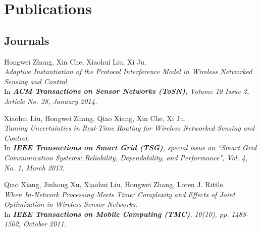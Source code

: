 
\section{Publications}
\subsection{Journals}
\begin{thebibliography}{3}
Hongwei Zhang, Xin Che, Xiaohui Liu, Xi Ju.
\\ \newblock \emph{Adaptive Instantiation of the Protocol Interference Model in Wireless Networked Sensing and Control}.
\\ \newblock In \emph{\textbf{ACM Transactions on Sensor Networks (ToSN)}, Volume 10 Issue 2, Article No. 28, January 2014.}

Xiaohui Liu, Hongwei Zhang, Qiao Xiang, Xin Che, Xi Ju.
\\ \newblock \emph{Taming Uncertainties in Real-Time Routing for Wireless Networked Sensing and Control}.
\\ \newblock In \emph{\textbf{IEEE Transactions on Smart Grid (TSG)}, special issue on “Smart Grid Communication Systems: Reliability, Dependability, and Performance", Vol. 4, No. 1, March 2013.}

Qiao Xiang, Jinhong Xu, Xiaohui Liu, Hongwei Zhang, Loren J. Rittle.
\\ \newblock \emph{When In-Network Processing Meets Time: Complexity and Effects of Joint Optimization in Wireless Sensor Networks}.
\\ \newblock In \emph{\textbf{IEEE Transactions on Mobile Computing (TMC)}, 10(10), pp. 1488-1502, October 2011.}

\end{thebibliography}


